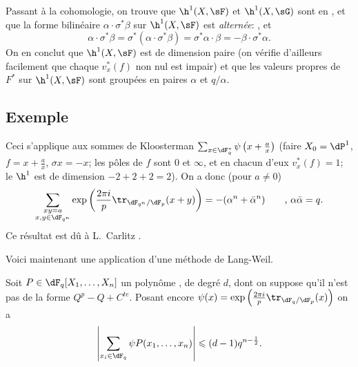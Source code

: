 Passant à la cohomologie, on trouve que $\h^1(X,\sF)$ et $\h^1(X,\sG)$ sont en 
, et que la forme bilinéaire 
$\alpha\cdot \sigma^\ast\beta$ sur $\h^1(X,\sF)$ est \emph{alternée}: 
, et 
\[
  \alpha\cdot \sigma^\ast \beta = \sigma^\ast(\alpha\cdot \sigma^\ast \beta) = \sigma^\ast \alpha\cdot \beta = -\beta\cdot \sigma^\ast \alpha \text{.} 
\]
On en conclut que $\h^1(X,\sF)$ est de dimension paire (on vérifie d'ailleurs 
facilement que chaque $v_x^\ast(f)$ non nul est impair) et que les valeurs 
propres de $F^\ast$ sur $\h^1(X,\sF)$ sont groupées en paires $\alpha$ et 
$q/\alpha$. 





\subsection{Exemple}\label{VI:3-7}

Ceci s'applique aux sommes de Kloosterman 
$\sum_{x\in \dF_q^\ast} \psi\left(x+\frac a x\right)$ (faire 
$X_0=\dP^1$, $f=x+\frac a x$, $\sigma x=-x$; les pôles de $f$ sont $0$ et 
$\infty$, et en chacun d'eux $v_x^\ast(f)=1$; le $\h^1$ est de dimension 
$-2+2+2=2$). On a donc (pour $a\ne 0$) 
\[
  \sum_{\substack{x y=a \\ x,y\in \dF_{q^n}}} \exp\left(\frac{2\pi i}{p} \tr_{\dF_{q^n}/\dF_p}(x+y)\right) = -(\alpha^n+\bar\alpha^n) \qquad \text{, }\alpha\bar \alpha = q \text{.} 
\]
Ce résultat est dû à L.\ Carlitz . 

Voici maintenant une application d'une méthode de Lang-Weil. 





\begin{proposition_}\label{VI:3-8}
Soit $P\in \dF_q[X_1,\dots,X_n]$ un polynôme , de degré 
$d$, dont on suppose qu'il n'est pas de la forme $Q^p-Q+C^{te}$. Posant encore 
$\psi(x) = \exp\left(\frac{2\pi i}{p} \tr_{\dF_q/\dF_p}(x)\right)$ on a 
\[
  \left|\sum_{x_i\in \dF_q} \psi P(x_1,\dots,x_n)\right| \leqslant (d-1) q^{n-\frac 1 2} \text{.}
\]
\end{proposition_}


